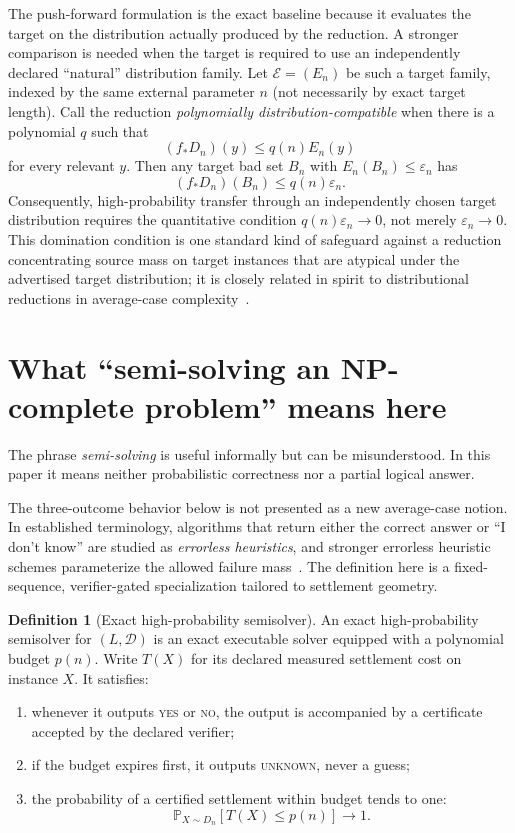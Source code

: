 \documentclass[11pt]{article}
\theoremstyle{definition}
\newtheorem{definition}[theorem]{Definition}
\newcommand{\Prob}{\mathbb{P}}
\begin{document}
The push-forward formulation is the exact baseline because it evaluates the target on the distribution actually produced by the reduction. A stronger comparison is needed when the target is required to use an independently declared ``natural'' distribution family. Let $\mathcal E=(E_n)$ be such a target family, indexed by the same external parameter $n$ (not necessarily by exact target length). Call the reduction \emph{polynomially distribution-compatible} when there is a polynomial $q$ such that
\[
(f_*D_n)(y)\le q(n)E_n(y)
\]
for every relevant $y$. Then any target bad set $B_n$ with $E_n(B_n)\le\varepsilon_n$ has
\[
(f_*D_n)(B_n)\le q(n)\varepsilon_n.
\]
Consequently, high-probability transfer through an independently chosen target distribution requires the quantitative condition $q(n)\varepsilon_n\to0$, not merely $\varepsilon_n\to0$. This domination condition is one standard kind of safeguard against a reduction concentrating source mass on target instances that are atypical under the advertised target distribution; it is closely related in spirit to distributional reductions in average-case complexity~\cite{Levin1986,BogdanovTrevisan2006}.

\section{What ``semi-solving an NP-complete problem'' means here}
The phrase \emph{semi-solving} is useful informally but can be misunderstood. In this paper it means neither probabilistic correctness nor a partial logical answer.

The three-outcome behavior below is not presented as a new average-case notion. In established terminology, algorithms that return either the correct answer or ``I don't know'' are studied as \emph{errorless heuristics}, and stronger errorless heuristic schemes parameterize the allowed failure mass~\cite{BogdanovSafra2007,BogdanovTrevisan2006}. The definition here is a fixed-sequence, verifier-gated specialization tailored to settlement geometry.

\begin{definition}[Exact high-probability semisolver]
An exact high-probability semisolver for $(L,\mathcal D)$ is an exact executable solver equipped with a polynomial budget $p(n)$. Write $T(X)$ for its declared measured settlement cost on instance $X$. It satisfies:
\begin{enumerate}[label=(\roman*)]
    \item whenever it outputs \textsc{yes} or \textsc{no}, the output is accompanied by a certificate accepted by the declared verifier;
    \item if the budget expires first, it outputs \textsc{unknown}, never a guess;
    \item the probability of a certified settlement within budget tends to one:
    \[
    \Prob_{X\sim D_n}[T(X)\le p(n)]\to1.
    \]
\end{enumerate}
\end{definition}
\end{document}
